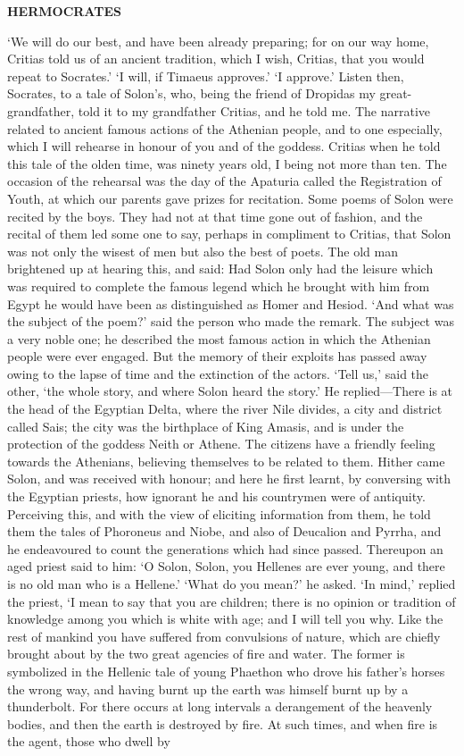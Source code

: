 \documentclass[11pt,letter]{article}
\begin{document}
\par \textbf{HERMOCRATES}
\par   ‘We will do our best, and have been already preparing; for on our way home, Critias told us of an ancient tradition, which I wish, Critias, that you would repeat to Socrates.’ ‘I will, if Timaeus approves.’ ‘I approve.’ Listen then, Socrates, to a tale of Solon’s, who, being the friend of Dropidas my great-grandfather, told it to my grandfather Critias, and he told me. The narrative related to ancient famous actions of the Athenian people, and to one especially, which I will rehearse in honour of you and of the goddess. Critias when he told this tale of the olden time, was ninety years old, I being not more than ten. The occasion of the rehearsal was the day of the Apaturia called the Registration of Youth, at which our parents gave prizes for recitation. Some poems of Solon were recited by the boys. They had not at that time gone out of fashion, and the recital of them led some one to say, perhaps in compliment to Critias, that Solon was not only the wisest of men but also the best of poets. The old man brightened up at hearing this, and said:  Had Solon only had the leisure which was required to complete the famous legend which he brought with him from Egypt he would have been as distinguished as Homer and Hesiod. ‘And what was the subject of the poem?’ said the person who made the remark. The subject was a very noble one; he described the most famous action in which the Athenian people were ever engaged. But the memory of their exploits has passed away owing to the lapse of time and the extinction of the actors. ‘Tell us,’ said the other, ‘the whole story, and where Solon heard the story.’ He replied—There is at the head of the Egyptian Delta, where the river Nile divides, a city and district called Sais; the city was the birthplace of King Amasis, and is under the protection of the goddess Neith or Athene. The citizens have a friendly feeling towards the Athenians, believing themselves to be related to them. Hither came Solon, and was received with honour; and here he first learnt, by conversing with the Egyptian priests, how ignorant he and his countrymen were of antiquity. Perceiving this, and with the view of eliciting information from them, he told them the tales of Phoroneus and Niobe, and also of Deucalion and Pyrrha, and he endeavoured to count the generations which had since passed. Thereupon an aged priest said to him:  ‘O Solon, Solon, you Hellenes are ever young, and there is no old man who is a Hellene.’ ‘What do you mean?’ he asked. ‘In mind,’ replied the priest, ‘I mean to say that you are children; there is no opinion or tradition of knowledge among you which is white with age; and I will tell you why. Like the rest of mankind you have suffered from convulsions of nature, which are chiefly brought about by the two great agencies of fire and water. The former is symbolized in the Hellenic tale of young Phaethon who drove his father’s horses the wrong way, and having burnt up the earth was himself burnt up by a thunderbolt. For there occurs at long intervals a derangement of the heavenly bodies, and then the earth is destroyed by fire. At such times, and when fire is the agent, those who dwell by 
\end{document}
